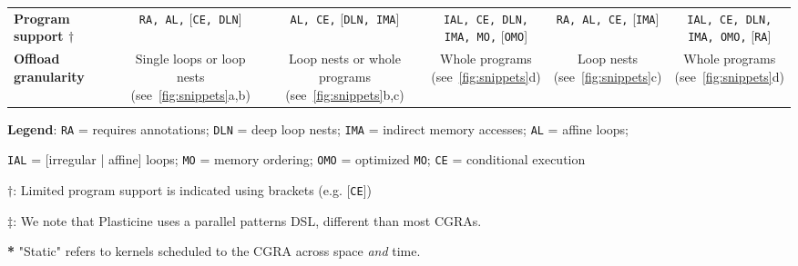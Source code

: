 {\begin{table}[htb]
\begin{threeparttable}
{\begin{tabular}{p{3cm}|cccc|c}
        \bf Program support $\dagger$ &
        \texttt{RA, AL,} [\texttt{CE, DLN}] & 
        \texttt{AL, CE,} [\texttt{DLN, IMA}] & 
        \thead{\texttt{IAL, CE, DLN,} \\ \texttt{IMA, MO,} [\texttt{OMO}]} &
        \texttt{RA, AL, CE,} [\texttt{IMA}] &
        \thead{\texttt{IAL, CE, DLN,} \\ \texttt{IMA, OMO,} [\texttt{RA}]}
			\\[.5ex]
				\bf Offload granularity &
        \thead{Single loops or loop \\ nests (see~\autoref{fig:snippets}a,b)} &
        \thead{Loop nests or  whole \\ programs (see~\autoref{fig:snippets}b,c)} &
        \thead{Whole programs \\ (see~\autoref{fig:snippets}d)} &
        \thead{Loop nests \\ (see~\autoref{fig:snippets}c)} &
        \thead{Whole programs \\ (see~\autoref{fig:snippets}d)}	
      \\[.5ex]
			\bottomrule
		 \end{tabular}
	}
  \begin{tablenotes}
    \tiny
  \item \textbf{Legend}: \texttt{RA} = requires annotations; \texttt{DLN} = deep loop nests; \texttt{IMA} = indirect memory accesses; \texttt{AL} = affine loops;
  \item \texttt{IAL} = [irregular | affine] loops; \texttt{MO} = memory ordering; \texttt{OMO} = optimized \texttt{MO}; \texttt{CE} = conditional execution
  \item \textbf{$\dagger$}: Limited program support is indicated using brackets (e.g. [\texttt{CE}])
  \item \textbf{$\ddagger$}: We note that Plasticine uses a parallel patterns DSL, different than most CGRAs. 
  \item \textbf{*} "Static" refers to kernels scheduled to the CGRA across space \textit{and} time.
  \end{tablenotes}
  \end{threeparttable}
	\end{table}
}

